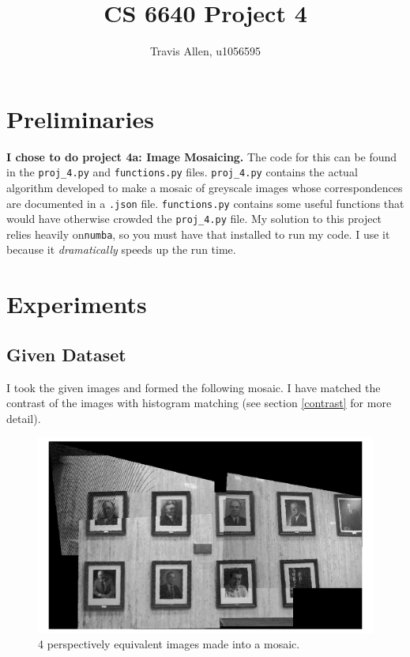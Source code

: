 \documentclass[]{article}
\title{CS 6640 Project 4}
\author{Travis Allen, u1056595}
\begin{document}
	\maketitle
	
	\newpage
	\section{Preliminaries}

	\vskip 10pt

	\textbf{I chose to do project 4a: Image Mosaicing.} The code for this can be found in the \texttt{proj\_4.py} and \texttt{functions.py} files. \texttt{proj\_4.py} contains the actual algorithm developed to make a mosaic of greyscale images whose correspondences are documented in a \texttt{.json} file. \texttt{functions.py} contains some useful functions that would have otherwise crowded the \texttt{proj\_4.py} file. My solution to this project relies heavily on\texttt{numba}, so you must have that installed to run my code. I use it because it \emph{dramatically} speeds up the run time. 

\section{Experiments}	
	\subsection{Given Dataset}
	I took the given images and formed the following mosaic. I have matched the contrast of the images with histogram matching (see section \ref{contrast} for more detail).
	
	\begin{figure}[H]
		\centering
		\includegraphics[width=6.5in]{test_images/hist_match.png}
		\caption{4 perspectively equivalent images made into a mosaic.}
	\end{figure}
	
\end{document}
